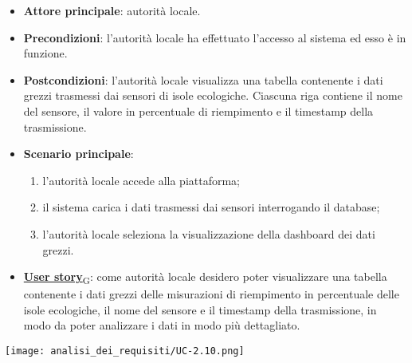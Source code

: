 \begin{itemize}
	\item \textbf{Attore principale}: autorità locale.
	\item \textbf{Precondizioni}: l'autorità locale ha effettuato l'accesso al sistema ed esso è in funzione.
	\item \textbf{Postcondizioni}: l'autorità locale visualizza una tabella contenente i dati grezzi trasmessi dai sensori di isole ecologiche.
	      Ciascuna riga contiene il nome del sensore, il valore in percentuale di riempimento e il timestamp della trasmissione.
	\item \textbf{Scenario principale}:
	      \begin{enumerate}
		      \item l'autorità locale accede alla piattaforma;
		      \item il sistema carica i dati trasmessi dai sensori interrogando il database;
		      \item l'autorità locale seleziona la visualizzazione della dashboard dei dati grezzi.
	      \end{enumerate}
	\item \href{https://7last.github.io/docs/rtb/documentazione-interna/glossario\#user-story}{\textbf{User story}\textsubscript{G}}:
	      come autorità locale desidero poter visualizzare una tabella contenente i dati grezzi delle misurazioni di riempimento in percentuale delle isole ecologiche,
	      il nome del sensore e il timestamp della trasmissione, in modo da poter analizzare i dati in modo più dettagliato.
\end{itemize}
\begin{center}
	\texttt{[image: analisi\_dei\_requisiti/UC-2.10.png]}
\end{center}



